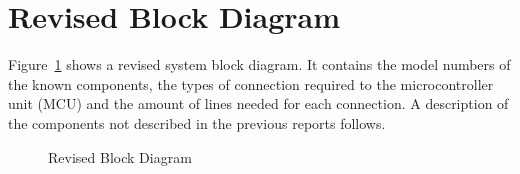 \section{Revised Block Diagram}

Figure~\ref{fig:blockDiagram} shows a revised system block diagram.  It contains the model numbers of the known components, the types of connection required to the microcontroller unit (MCU) and the amount of lines needed for each connection.  A description of the components not described in the previous reports follows.

\begin{figure}[H]
	\centering
	\caption{Revised Block Diagram \label{fig:blockDiagram}}
\end{figure}
